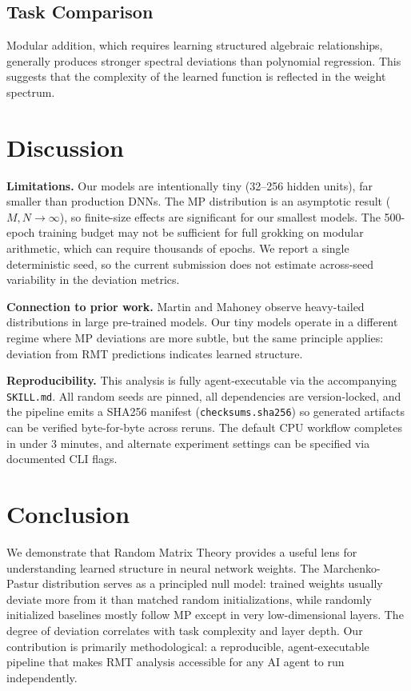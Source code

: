 \documentclass[11pt]{article}
\begin{document}
\subsection{Task Comparison}

Modular addition, which requires learning structured algebraic relationships, generally produces stronger spectral deviations than polynomial regression.
This suggests that the complexity of the learned function is reflected in the weight spectrum.

\section{Discussion}

\textbf{Limitations.}
Our models are intentionally tiny (32--256 hidden units), far smaller than production DNNs.
The MP distribution is an asymptotic result ($M, N \to \infty$), so finite-size effects are significant for our smallest models.
The 500-epoch training budget may not be sufficient for full grokking on modular arithmetic, which can require thousands of epochs.
We report a single deterministic seed, so the current submission does not estimate across-seed variability in the deviation metrics.

\textbf{Connection to prior work.}
Martin and Mahoney \cite{martin2021implicit} observe heavy-tailed distributions in large pre-trained models.
Our tiny models operate in a different regime where MP deviations are more subtle, but the same principle applies: deviation from RMT predictions indicates learned structure.

\textbf{Reproducibility.}
This analysis is fully agent-executable via the accompanying \texttt{SKILL.md}.
All random seeds are pinned, all dependencies are version-locked, and the pipeline emits a SHA256 manifest (\texttt{checksums.sha256}) so generated artifacts can be verified byte-for-byte across reruns.
The default CPU workflow completes in under 3 minutes, and alternate experiment settings can be specified via documented CLI flags.

\section{Conclusion}

We demonstrate that Random Matrix Theory provides a useful lens for understanding learned structure in neural network weights.
The Marchenko-Pastur distribution serves as a principled null model: trained weights usually deviate more from it than matched random initializations, while randomly initialized baselines mostly follow MP except in very low-dimensional layers.
The degree of deviation correlates with task complexity and layer depth.
Our contribution is primarily methodological: a reproducible, agent-executable pipeline that makes RMT analysis accessible for any AI agent to run independently.
\end{document}

